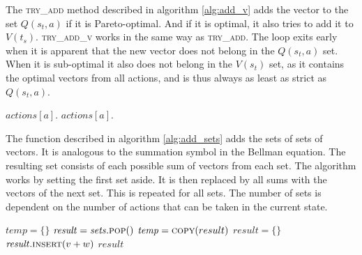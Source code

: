 \documentclass{article}
\begin{document}
		\begin{multicols}{2}
		The \textsc{try\_add} method described in algorithm
		\ref{alg:add_v} adds the vector to the set $Q(s_t, a)$ if it is
		Pareto-optimal. And if it is optimal, it also tries to add it to
		$V(t_s)$. \textsc{try\_add\_v} works in the same way as
		\textsc{try\_add}. The loop exits early when it is apparent that the new
		vector does not belong in the $Q(s_t, a)$ set. When it is sub-optimal it
		also does not belong in the $V(s_t)$ set, as it contains the optimal
		vectors from all actions, and is thus always as least as strict as
		$Q(s_t, a)$.
		\end{multicols}

		\begin{algorithm}[h!]
			\begin{algorithmic}[1]
				\State \Return {}
				\State \Return {}
				\State $\mathit{actions}[a].$
				\EndIf
				\EndFor
				\State $\mathit{actions}[a].$
				\State {} 
				\EndProcedure
			\end{algorithmic}
			\label{alg:add_v}
		\end{algorithm}

		\begin{multicols}{2}
		The function described in algorithm \ref{alg:add_sets} adds the sets of
		sets of vectors. It is analogous to the summation symbol in the Bellman
		equation. The resulting set consists of each possible sum of vectors from
		each set. The algorithm works by setting the first set aside. It is then
		replaced by all sums with the vectors of the next set. This is repeated
		for all sets. The number of sets is dependent on the number of actions
		that can be taken in the current state.
		\end{multicols}

		\begin{algorithm}[h!]
			\begin{algorithmic}[1]
				\State $\mathit{temp} = \{\}$
				\State $\mathit{result} = \mathit{sets}.\Call{pop}{}()$
				\State $\mathit{temp} = \Call{copy}{result}$
				\State $\mathit{result} = \{\}$
				\State $\mathit{result}.\Call{insert}{v+w}$
				\EndFor
				\EndFor
				\EndFor
				\State \Return $\mathit{result}$
				\EndFunction
			\end{algorithmic}
			\label{alg:add_sets}
		\end{algorithm}
\end{document}
